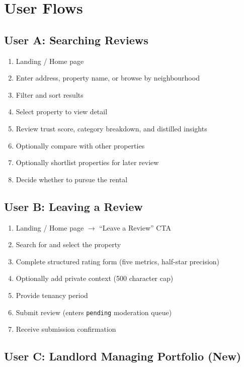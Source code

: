 \documentclass[11pt,letterpaper]{article}
\begin{document}
\section{User Flows}

\subsection{User A: Searching Reviews}

\begin{enumerate}
    \item Landing / Home page
    \item Enter address, property name, or browse by neighbourhood
    \item Filter and sort results
    \item Select property to view detail
    \item Review trust score, category breakdown, and distilled insights
    \item Optionally compare with other properties
    \item Optionally shortlist properties for later review
    \item Decide whether to pursue the rental
\end{enumerate}

\subsection{User B: Leaving a Review}

\begin{enumerate}
    \item Landing / Home page $\rightarrow$ ``Leave a Review'' CTA
    \item Search for and select the property
    \item Complete structured rating form (five metrics, half-star precision)
    \item Optionally add private context (500 character cap)
    \item Provide tenancy period
    \item Submit review (enters \texttt{pending} moderation queue)
    \item Receive submission confirmation
\end{enumerate}

\subsection{User C: Landlord Managing Portfolio (New)}
\end{document}
